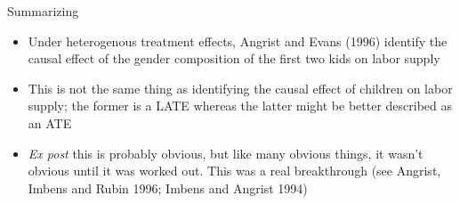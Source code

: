 \documentclass{beamer}
\begin{document}
\begin{frame}{Summarizing}

		\begin{itemize}
		\item Under heterogenous treatment effects, Angrist and Evans (1996) identify the causal effect of the gender composition of the first two kids on labor supply		
		\item This is not the same thing as identifying the causal effect of children on labor supply; the former is a LATE whereas the latter might be better described as an ATE
		\item \emph{Ex post} this is probably obvious, but like many obvious things, it wasn't obvious until it was worked out.  This was a real breakthrough (see Angrist, Imbens and Rubin 1996; Imbens and Angrist 1994)
		\end{itemize}

\end{frame}
	

	
	
\end{document}
